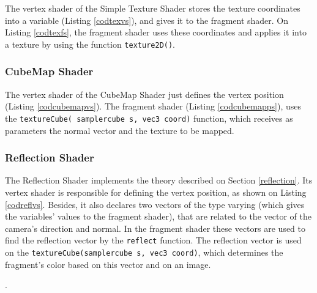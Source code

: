 \documentclass[10pt, conference, compsocconf]{IEEEtran}
\begin{document}
{	The vertex shader of the Simple Texture Shader stores the texture coordinates into a variable (Listing \ref{codtexvs}),  and gives it to the fragment shader. On Listing \ref{codtexfs}, 
the fragment shader uses these coordinates and applies it into a texture by using the function \texttt{texture2D()}.

	

	

\subsubsection{CubeMap Shader}	

 	The vertex shader of the CubeMap Shader just defines the vertex position (Listing \ref{codcubemapvs}). The fragment shader (Listing \ref{codcubemapps}), uses the \texttt{textureCube( samplercube s, vec3 coord)} function,
which receives as parameters the normal vector and the texture to be mapped.

	

	

\subsubsection{Reflection Shader}

	The Reflection Shader implements the theory described on Section \ref{reflection}. Its vertex shader is responsible for defining the vertex position, as shown on Listing \ref{codreflvs}. Besides, it also declares two vectors of the type varying (which gives the variables' values to the fragment shader), that are related to the vector of the camera's direction and normal. In the fragment shader these vectors are used to find the reflection vector by the \texttt{reflect} function. The reflection vector is used on the  \texttt{textureCube(samplercube s, vec3 coord)}, which determines the fragment's color based on this vector and on an image. 

	. 

}
\end{document}
